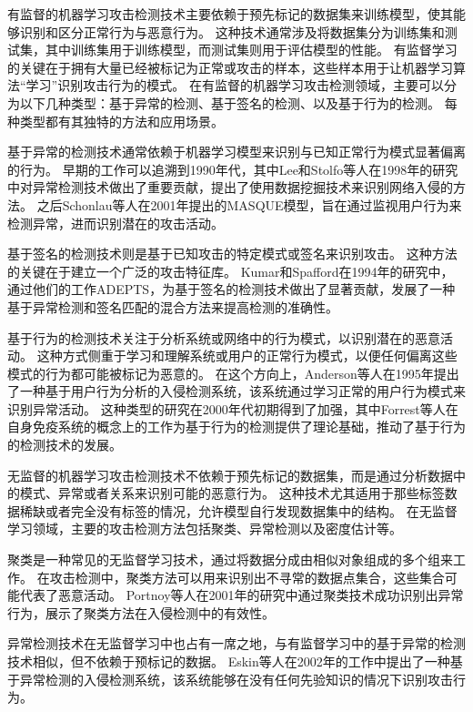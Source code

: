 有监督的机器学习攻击检测技术主要依赖于预先标记的数据集来训练模型，使其能够识别和区分正常行为与恶意行为。
这种技术通常涉及将数据集分为训练集和测试集，其中训练集用于训练模型，而测试集则用于评估模型的性能。
有监督学习的关键在于拥有大量已经被标记为正常或攻击的样本，这些样本用于让机器学习算法“学习”识别攻击行为的模式。
在有监督的机器学习攻击检测领域，主要可以分为以下几种类型：基于异常的检测、基于签名的检测、以及基于行为的检测。
每种类型都有其独特的方法和应用场景。


基于异常的检测技术通常依赖于机器学习模型来识别与已知正常行为模式显著偏离的行为。
早期的工作可以追溯到1990年代，其中Lee和Stolfo等人\cite{lee1998dataMining}在1998年的研究中对异常检测技术做出了重要贡献，提出了使用数据挖掘技术来识别网络入侵的方法。
之后Schonlau等人在2001年提出的MASQUE模型，旨在通过监视用户行为来检测异常，进而识别潜在的攻击活动。

基于签名的检测技术则是基于已知攻击的特定模式或签名来识别攻击。
这种方法的关键在于建立一个广泛的攻击特征库。
Kumar和Spafford\cite{kumar1994adep}在1994年的研究中，通过他们的工作ADEPTS，为基于签名的检测技术做出了显著贡献，发展了一种基于异常检测和签名匹配的混合方法来提高检测的准确性。

基于行为的检测技术关注于分析系统或网络中的行为模式，以识别潜在的恶意活动。
这种方式侧重于学习和理解系统或用户的正常行为模式，以便任何偏离这些模式的行为都可能被标记为恶意的。
在这个方向上，Anderson等人\cite{anderson1995userBehavior}在1995年提出了一种基于用户行为分析的入侵检测系统，该系统通过学习正常的用户行为模式来识别异常活动。
这种类型的研究在2000年代初期得到了加强，其中Forrest等人\cite{forrest1996selfImmune}在自身免疫系统的概念上的工作为基于行为的检测提供了理论基础，推动了基于行为的检测技术的发展。



无监督的机器学习攻击检测技术不依赖于预先标记的数据集，而是通过分析数据中的模式、异常或者关系来识别可能的恶意行为。
这种技术尤其适用于那些标签数据稀缺或者完全没有标签的情况，允许模型自行发现数据集中的结构。
在无监督学习领域，主要的攻击检测方法包括聚类、异常检测以及密度估计等。

聚类是一种常见的无监督学习技术，通过将数据分成由相似对象组成的多个组来工作。
在攻击检测中，聚类方法可以用来识别出不寻常的数据点集合，这些集合可能代表了恶意活动。
Portnoy等人\cite{portnoy2001clustering}在2001年的研究中通过聚类技术成功识别出异常行为，展示了聚类方法在入侵检测中的有效性。

异常检测技术在无监督学习中也占有一席之地，与有监督学习中的基于异常的检测技术相似，但不依赖于预标记的数据。
Eskin等人\cite{eskin2002anomaly}在2002年的工作中提出了一种基于异常检测的入侵检测系统，该系统能够在没有任何先验知识的情况下识别攻击行为。

